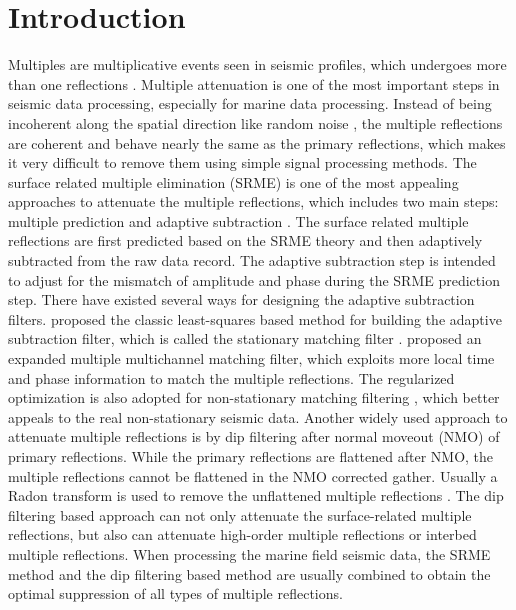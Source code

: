 \section{Introduction} 
Multiples are multiplicative events seen in seismic profiles, which undergoes more than one reflections \cite{wujiandemul2016}. Multiple attenuation is one of the most important steps in seismic data processing, especially for marine data processing. Instead of being incoherent along the spatial direction like random noise \cite{hongbo2015,yangkang2016dsd}, the multiple reflections are coherent and behave nearly the same as the primary reflections, which makes it very difficult to remove them using simple signal processing methods. The surface related multiple elimination (SRME) is one of the most appealing approaches to attenuate the multiple reflections, which includes two main steps: multiple prediction and adaptive subtraction \cite{verschuur1992,shoudong2009}.  The surface related multiple reflections are first predicted based on the SRME theory and then adaptively subtracted from the raw data record. The adaptive subtraction step is intended to adjust for the mismatch of amplitude and phase during the SRME prediction step. There have existed several ways for designing the adaptive subtraction filters. \cite{verschuur1992} proposed  the classic least-squares based method for building the adaptive subtraction filter, which is called the stationary matching filter \cite{shebao2015}. \cite{yanghua20031} proposed an expanded multiple multichannel matching filter, which exploits more local time and phase information to match the multiple reflections. The regularized optimization is also adopted for non-stationary matching filtering \cite{fomel20095,yangkang2015ortho}, which better appeals to the real non-stationary seismic data. Another widely used approach to attenuate multiple reflections is by dip filtering after normal moveout (NMO) of primary reflections. While the primary reflections are flattened after NMO, the multiple reflections cannot be flattened in the NMO corrected gather. Usually a Radon transform is used to remove the unflattened multiple reflections \cite{foster1992,yanghua2003,porsani2011,donno2011,zhuang2015,yarudemul2016}. The dip filtering based approach can not only attenuate the surface-related multiple reflections, but also can attenuate high-order multiple reflections or interbed multiple reflections. When processing the marine field seismic data, the SRME method and the dip filtering based method are usually combined to obtain the optimal suppression of all types of multiple reflections.

